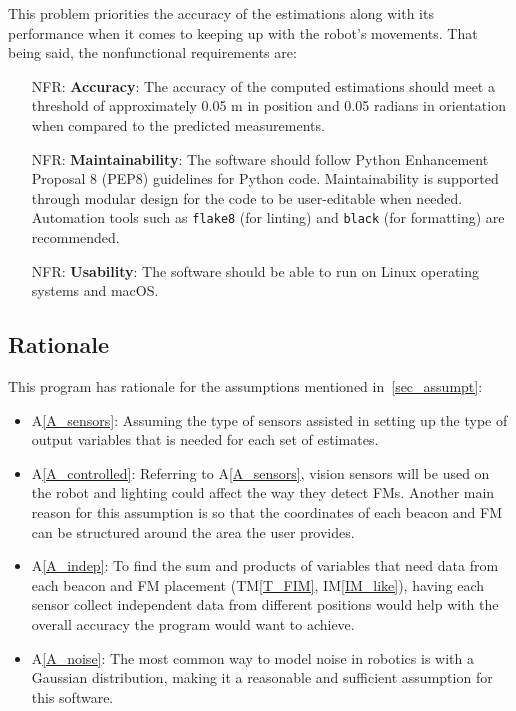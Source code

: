 \documentclass[12pt]{article}
\newcommand{\tref}[1]{TM\ref{#1}}
\newcommand{\aref}[1]{A\ref{#1}}
\newcommand{\iref}[1]{IM\ref{#1}}
\newcounter{nfrnum} %
\begin{document}
This problem priorities the accuracy of the estimations along with its performance when it comes to keeping up with the robot's movements. That being said, the nonfunctional requirements are:

\noindent \begin{itemize}

\item[NFR\refstepcounter{nfrnum}\thenfrnum \label{NFR_Accuracy}:]
  \textbf{Accuracy}: The accuracy of the computed estimations should meet a threshold of approximately 0.05 m in position and 0.05 radians in orientation when compared to the predicted measurements. 

\item[NFR\refstepcounter{nfrnum}\thenfrnum \label{NFR_Maintainability}:]
  \textbf{Maintainability}: The software should follow Python Enhancement Proposal 8 (PEP8) guidelines for Python code. Maintainability is supported through modular design for the code to be user-editable when needed. Automation tools such as \texttt{flake8} (for linting) and \texttt{black} (for formatting) are recommended.

\item[NFR\refstepcounter{nfrnum}\thenfrnum \label{NFR_Reusability}:]
  \textbf{Usability}: The software should be able to run on Linux operating systems and macOS.
\end{itemize}

\subsection{Rationale}

This program has rationale for the assumptions mentioned in~\ref{sec_assumpt}:
\begin{itemize}
  \item \aref{A_sensors}: Assuming the type of sensors assisted in setting up the type of output variables that is needed for each set of estimates.
  \item \aref{A_controlled}: Referring to \aref{A_sensors}, vision sensors will be used on the robot and lighting could affect the way they detect FMs. Another main reason for this assumption is so that the coordinates of each beacon and FM can be structured around the area the user provides.
  \item \aref{A_indep}: To find the sum and products of variables that need data from each beacon and FM placement (\tref{T_FIM}, \iref{IM_like}), having each sensor collect independent data from different positions would help with the overall accuracy the program would want to achieve.
  \item \aref{A_noise}: The most common way to model noise in robotics is with a Gaussian distribution, making it a reasonable and sufficient assumption for this software.
\end{itemize}
\end{document}
